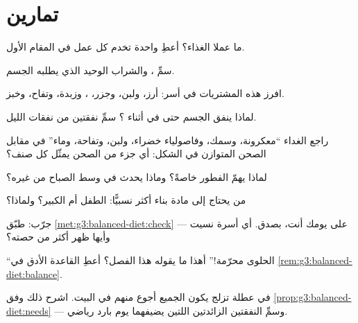 \section{تمارين}

\begin{exercise}[$\star$]\label{exo:g3:balanced-diet:1}
ما عملا الغذاء؟ أعطِ  واحدة تخدم كل عمل في المقام
الأول.
\end{exercise}

\begin{exercise}[$\star$]\label{exo:g3:balanced-diet:2}
سمِّ ، والشراب الوحيد الذي يطلبه الجسم.
\end{exercise}

\begin{exercise}[$\star$]\label{exo:g3:balanced-diet:3}
افرز هذه المشتريات في أسر: أرز، ولبن، وجزر، ، وزبدة، وتفاح،
وخبز.
\end{exercise}

\begin{exercise}[$\star$]\label{exo:g3:balanced-diet:4}
لماذا ينفق الجسم  حتى في أثناء ؟ سمِّ نفقتين من نفقات
الليل.
\end{exercise}

\begin{exercise}[$\star$]\label{exo:g3:balanced-diet:5}
راجع الغداء ``معكرونة، وسمك، وفاصولياء خضراء، ولبن، وتفاحة،
وماء'' في مقابل الصحن المتوازن في الشكل: أي جزء من الصحن يمثّل كل
صنف؟
\end{exercise}

\begin{exercise}[$\star$]\label{exo:g3:balanced-diet:6}
لماذا يهمّ الفطور خاصةً؟ وماذا يحدث في وسط الصباح من غيره؟
\end{exercise}

\begin{exercise}[$\star$]\label{exo:g3:balanced-diet:7}
من يحتاج إلى مادة بناء أكثر نسبيًّا: الطفل أم الكبير؟ ولماذا؟
\end{exercise}

\begin{exercise}[$\star$]\label{exo:g3:balanced-diet:8}
جرّب: طبّق \cref{met:g3:balanced-diet:check} على يومك أنت، بصدق.
أي أسرة نسيت --- وأيها ظهر أكثر من حصته؟
\end{exercise}

\begin{exercise}[$\star\star$]\label{exo:g3:balanced-diet:9}
``الحلوى محرّمة!'' أهذا ما يقوله هذا الفصل؟ أعطِ القاعدة الأدق في
\cref{rem:g3:balanced-diet:balance}.
\end{exercise}

\begin{exercise}[$\star\star$]\label{exo:g3:balanced-diet:10}
في عطلة تزلج يكون الجميع أجوع منهم في البيت. اشرح ذلك وفق
\cref{prop:g3:balanced-diet:needs} --- وسمِّ النفقتين الزائدتين
اللتين يضيفهما يوم بارد رياضي.
\end{exercise}
